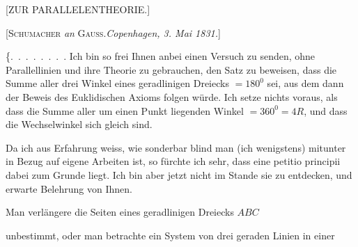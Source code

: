 

\clearpage
{}%
\begin{center}
[ZUR PARALLELENTHEORIE.]

[\textsc{Schumacher} \emph{an} \textsc{Gauss}.\quad \emph{Copenhagen, 3. Mai 1831.}]
\end{center}

\{\mbox{.\ .\ .\ .\ .\ .\ .\ .} Ich bin so frei Ihnen anbei einen Versuch zu senden, ohne Parallellinien und ihre Theorie zu gebrauchen, den Satz zu beweisen, dass die Summe aller drei Winkel eines geradlinigen Dreiecks $= 180^{0}$ sei, aus dem dann der Beweis des Euklidischen Axioms folgen würde. Ich setze nichts voraus, als dass die Summe aller um einen Punkt liegenden Winkel $= 360^{0} = 4R$, und dass die Wechselwinkel sich gleich sind.

Da ich aus Erfahrung weiss, wie sonderbar blind man (ich wenigstens) mitunter in Bezug auf eigene Arbeiten ist, so fürchte ich sehr, dass eine petitio principii dabei zum Grunde liegt. Ich bin aber jetzt nicht im Stande sie zu entdecken, und erwarte Belehrung von Ihnen.

\textls{[Beilage.]} Man verlängere die Seiten eines geradlinigen Dreiecks $ABC$

\begin{center}

\par [Fig. 1.]
\end{center}

\noindent unbestimmt, oder man betrachte ein System von drei geraden Linien in einer
